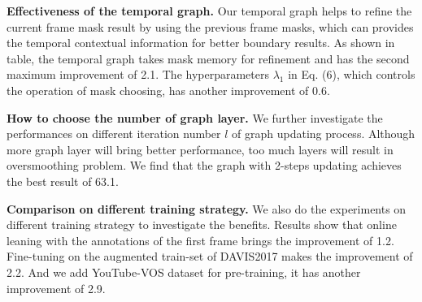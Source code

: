 \documentclass[letterpaper]{article} %
\begin{document}
\noindent \textbf{Effectiveness of the temporal graph.}
Our temporal graph helps to refine the current frame mask result by using the previous frame masks, which can provides the temporal contextual information for better boundary results. As shown in table,
the temporal graph takes mask memory for refinement and has the second maximum improvement of 2.1.  The hyperparameters $\lambda_1$ in Eq. (6), which controls the operation of mask choosing, has another improvement of 0.6.

\noindent \textbf{How to choose the number of graph layer.}
We further investigate the performances on different iteration number $l$ of graph updating process. Although more graph layer will bring better performance, too much layers will result in oversmoothing problem. We find that the graph with 2-steps updating achieves the best result of 63.1.

\noindent \textbf{Comparison on different training strategy.}
We also do the experiments on different training strategy to investigate the benefits. Results show that online leaning with the annotations of the first frame brings the improvement of 1.2. Fine-tuning on the augmented train-set of DAVIS2017 makes the improvement of 2.2. And we add YouTube-VOS dataset for pre-training, it has another improvement of 2.9.
\end{document}
